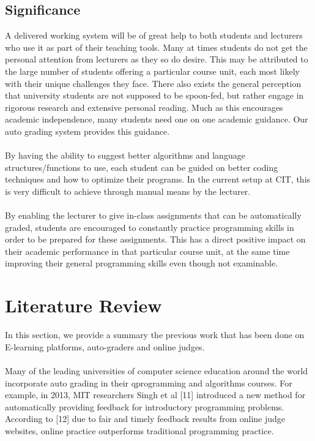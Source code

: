 \documentclass[12pt]{article}
\begin{document}
	\subsection{Significance}
			A delivered working system will be of great help to both students and lecturers who use it
		as part of their teaching tools. Many at times students do not get the personal attention
		from lecturers as they so do desire. This may be attributed to the large number of students
		offering a particular course unit, each most likely with their unique challenges they face.
		There also exists the general perception that university students are not supposed to be
		spoon-fed, but rather engage in rigorous research and extensive personal reading. Much
		as this encourages academic independence, many students need one on one academic
		guidance. Our auto grading system provides this guidance. \\ \\
			By having the ability to suggest better algorithms and language structures/functions to use,
		each student can be guided on better coding techniques and how to optimize their programs. In the current setup at 				CIT, this is very difficult to achieve through manual means by the lecturer. \\ \\
			By enabling the lecturer to give in-class assignments that can be automatically graded,
		students are encouraged to constantly practice programming skills in order to be prepared
		for these assignments. This has a direct positive impact on their academic performance in
		that particular course unit, at the same time improving their general programming skills
		even though not examinable. 

\newpage
\section{Literature Review}
	In this section, we provide a summary the previous work that has been done on E-learning platforms, auto-graders and online 			judges.\\ \\
		Many of the leading universities of computer science education around the world incorporate auto grading in their 			qprogramming and algorithms courses. For example, in 2013, MIT researchers Singh et al [11] introduced a new method for 			automatically providing feedback for introductory programming problems. According to [12] due to fair and timely feedback 			results from online 	judge websites, online practice outperforms traditional programming practice.
\end{document}
